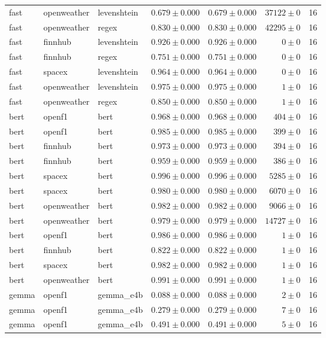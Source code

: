 \begin{table}[htbp]
\begin{tabular}{l l l r r r r}
fast & openweather & levenshtein & $0.679\pm0.000$ & $0.679\pm0.000$ & $37122\pm0$ & 16 \\
fast & openweather & regex & $0.830\pm0.000$ & $0.830\pm0.000$ & $42295\pm0$ & 16 \\
fast & finnhub & levenshtein & $0.926\pm0.000$ & $0.926\pm0.000$ & $0\pm0$ & 16 \\
fast & finnhub & regex & $0.751\pm0.000$ & $0.751\pm0.000$ & $0\pm0$ & 16 \\
fast & spacex & levenshtein & $0.964\pm0.000$ & $0.964\pm0.000$ & $0\pm0$ & 16 \\
fast & openweather & levenshtein & $0.975\pm0.000$ & $0.975\pm0.000$ & $1\pm0$ & 16 \\
fast & openweather & regex & $0.850\pm0.000$ & $0.850\pm0.000$ & $1\pm0$ & 16 \\
bert & openf1 & bert & $0.968\pm0.000$ & $0.968\pm0.000$ & $404\pm0$ & 16 \\
bert & openf1 & bert & $0.985\pm0.000$ & $0.985\pm0.000$ & $399\pm0$ & 16 \\
bert & finnhub & bert & $0.973\pm0.000$ & $0.973\pm0.000$ & $394\pm0$ & 16 \\
bert & finnhub & bert & $0.959\pm0.000$ & $0.959\pm0.000$ & $386\pm0$ & 16 \\
bert & spacex & bert & $0.996\pm0.000$ & $0.996\pm0.000$ & $5285\pm0$ & 16 \\
bert & spacex & bert & $0.980\pm0.000$ & $0.980\pm0.000$ & $6070\pm0$ & 16 \\
bert & openweather & bert & $0.982\pm0.000$ & $0.982\pm0.000$ & $9066\pm0$ & 16 \\
bert & openweather & bert & $0.979\pm0.000$ & $0.979\pm0.000$ & $14727\pm0$ & 16 \\
bert & openf1 & bert & $0.986\pm0.000$ & $0.986\pm0.000$ & $1\pm0$ & 16 \\
bert & finnhub & bert & $0.822\pm0.000$ & $0.822\pm0.000$ & $1\pm0$ & 16 \\
bert & spacex & bert & $0.982\pm0.000$ & $0.982\pm0.000$ & $1\pm0$ & 16 \\
bert & openweather & bert & $0.991\pm0.000$ & $0.991\pm0.000$ & $1\pm0$ & 16 \\
gemma & openf1 & gemma\_e4b & $0.088\pm0.000$ & $0.088\pm0.000$ & $2\pm0$ & 16 \\
gemma & openf1 & gemma\_e4b & $0.279\pm0.000$ & $0.279\pm0.000$ & $7\pm0$ & 16 \\
gemma & openf1 & gemma\_e4b & $0.491\pm0.000$ & $0.491\pm0.000$ & $5\pm0$ & 16 \\

\end{tabular}
\end{table}
